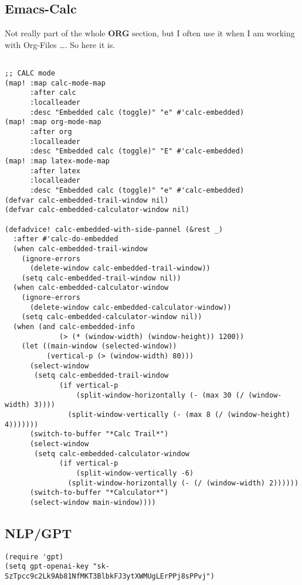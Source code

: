 \documentclass[11pt]{article}
\begin{document}
\subsection{Emacs-Calc}
\label{sec:orgcb249d9}
Not really part of the whole \textbf{ORG} section, but I often use it when I am working with Org-Files \ldots{}. So here it is.
\begin{verbatim}

;; CALC mode
(map! :map calc-mode-map
      :after calc
      :localleader
      :desc "Embedded calc (toggle)" "e" #'calc-embedded)
(map! :map org-mode-map
      :after org
      :localleader
      :desc "Embedded calc (toggle)" "E" #'calc-embedded)
(map! :map latex-mode-map
      :after latex
      :localleader
      :desc "Embedded calc (toggle)" "e" #'calc-embedded)
(defvar calc-embedded-trail-window nil)
(defvar calc-embedded-calculator-window nil)

(defadvice! calc-embedded-with-side-pannel (&rest _)
  :after #'calc-do-embedded
  (when calc-embedded-trail-window
    (ignore-errors
      (delete-window calc-embedded-trail-window))
    (setq calc-embedded-trail-window nil))
  (when calc-embedded-calculator-window
    (ignore-errors
      (delete-window calc-embedded-calculator-window))
    (setq calc-embedded-calculator-window nil))
  (when (and calc-embedded-info
             (> (* (window-width) (window-height)) 1200))
    (let ((main-window (selected-window))
          (vertical-p (> (window-width) 80)))
      (select-window
       (setq calc-embedded-trail-window
             (if vertical-p
                 (split-window-horizontally (- (max 30 (/ (window-width) 3))))
               (split-window-vertically (- (max 8 (/ (window-height) 4)))))))
      (switch-to-buffer "*Calc Trail*")
      (select-window
       (setq calc-embedded-calculator-window
             (if vertical-p
                 (split-window-vertically -6)
               (split-window-horizontally (- (/ (window-width) 2))))))
      (switch-to-buffer "*Calculator*")
      (select-window main-window))))
\end{verbatim}

\subsection{NLP/GPT}
\label{sec:org4f86e21}
\begin{verbatim}
(require 'gpt)
(setq gpt-openai-key "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")
\end{verbatim}
\end{document}
